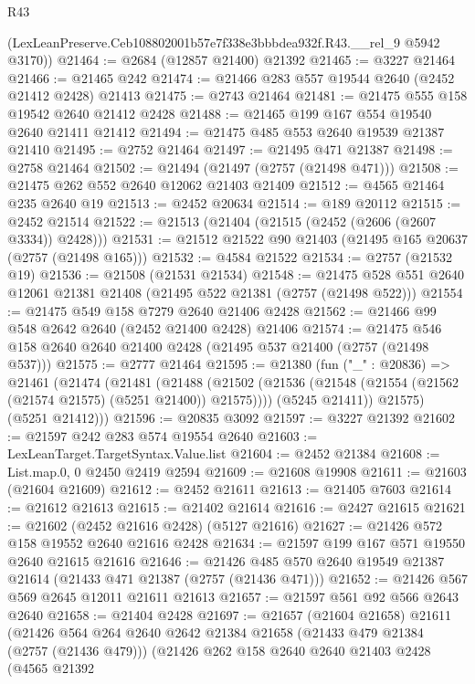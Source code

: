 \begin{lexlean}{R43}
\begin{coremodule}
      (LexLeanPreserve.Ceb108802001b57e7f338e3bbbdea932f.R43.__rel_9 @5942 @3170))
@21464 := @2684 (@12857 @21400) @21392
@21465 := @3227 @21464
@21466 := @21465 @242
@21474 := @21466 @283 @557 @19544 @2640 (@2452 @21412 @2428) @21413
@21475 := @2743 @21464
@21481 := @21475 @555 @158 @19542 @2640 @21412 @2428
@21488 := @21465 @199 @167 @554 @19540 @2640 @21411 @21412
@21494 := @21475 @485 @553 @2640 @19539 @21387 @21410
@21495 := @2752 @21464
@21497 := @21495 @471 @21387
@21498 := @2758 @21464
@21502 := @21494 (@21497 (@2757 (@21498 @471)))
@21508 := @21475 @262 @552 @2640 @12062 @21403 @21409
@21512 := @4565 @21464 @235 @2640 @19
@21513 := @2452 @20634
@21514 := @189 @20112
@21515 := @2452 @21514
@21522 := @21513 (@21404 (@21515 (@2452 (@2606 (@2607 @3334)) @2428)))
@21531 := @21512 @21522 @90 @21403 (@21495 @165 @20637 (@2757 (@21498 @165)))
@21532 := @4584 @21522
@21534 := @2757 (@21532 @19)
@21536 := @21508 (@21531 @21534)
@21548 := @21475 @528 @551 @2640 @12061 @21381 @21408 (@21495 @522 @21381 (@2757 (@21498 @522)))
@21554 := @21475 @549 @158 @7279 @2640 @21406 @2428
@21562 := @21466 @99 @548 @2642 @2640 (@2452 @21400 @2428) @21406
@21574 := @21475 @546 @158 @2640 @2640 @21400 @2428 (@21495 @537 @21400 (@2757 (@21498 @537)))
@21575 := @2777 @21464
@21595 := @21380
    (fun ("_" : @20836) =>
    @21461
      (@21474
        (@21481
          (@21488
            (@21502 (@21536 (@21548 (@21554 (@21562 (@21574 @21575) (@5251 @21400)) @21575))))
            (@5245 @21411))
          @21575)
        (@5251 @21412)))
@21596 := @20835 @3092
@21597 := @3227 @21392
@21602 := @21597 @242 @283 @574 @19554 @2640
@21603 := LexLeanTarget.TargetSyntax.Value.list
@21604 := @2452 @21384
@21608 := List.map.{0, 0} @2450 @2419 @2594
@21609 := @21608 @19908
@21611 := @21603 (@21604 @21609)
@21612 := @2452 @21611
@21613 := @21405 @7603
@21614 := @21612 @21613
@21615 := @21402 @21614
@21616 := @2427 @21615
@21621 := @21602 (@2452 @21616 @2428) (@5127 @21616)
@21627 := @21426 @572 @158 @19552 @2640 @21616 @2428
@21634 := @21597 @199 @167 @571 @19550 @2640 @21615 @21616
@21646 := @21426 @485 @570 @2640 @19549 @21387 @21614 (@21433 @471 @21387 (@2757 (@21436 @471)))
@21652 := @21426 @567 @569 @2645 @12011 @21611 @21613
@21657 := @21597 @561 @92 @566 @2643 @2640
@21658 := @21404 @2428
@21697 := @21657
    (@21604 @21658)
    @21611
    (@21426
      @564
      @264
      @2640
      @2642
      @21384
      @21658
      (@21433 @479 @21384 (@2757 (@21436 @479)))
      (@21426
        @262
        @158
        @2640
        @2640
        @21403
        @2428
        (@4565
          @21392

\end{coremodule}
\end{lexlean}
